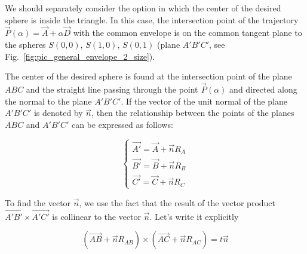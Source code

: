 \documentclass[
11pt,%
tightenlines,%
twoside,%
onecolumn,%
nofloats,%
nobibnotes,%
nofootinbib,%
superscriptaddress,%
noshowpacs,%
centertags]%
{revtex4-2}
\begin{document}
We should separately consider the option in which the center of the desired sphere is inside the triangle.
In this case, the intersection point of the trajectory $\vec{P}(\alpha) = \vec{A} + \alpha \vec{D}$ with the common envelope is on the common tangent plane to the spheres $S(0, 0)$, $S(1, 0)$, $S(0, 1)$ (plane $A'B'C'$, see Fig.~\ref{fig:pic_general_envelope_2_size}).

The center of the desired sphere is found at the intersection point of the plane $ABC$ and the straight line passing through the point $\vec{P}(\alpha)$ and directed along the normal to the plane $A'B'C'$.
If the vector of the unit normal of the plane $A'B'C'$ is denoted by $\vec{n}$, then the relationship between the points of the planes $ABC$ and $A'B'C'$ can be expressed as follows:

\begin{equation}
\begin{cases}
\vec{A'} = \vec{A} + \vec{n} R_A \\
\vec{B'} = \vec{B} + \vec{n} R_B \\
\vec{C'} = \vec{C} + \vec{n} R_C
\end{cases}
\end{equation}

To find the vector $\vec{n}$, we use the fact that the result of the vector product $\vec{A'B'} \times \vec{A'C'}$ is collinear to the vector $\vec{n}$.
Let's write it explicitly

\begin{equation}
(\vec{AB} + \vec{n} R_{AB}) \times (\vec{AC} + \vec{n} R_{AC}) = t \vec{n}
\end{equation}
\end{document}

